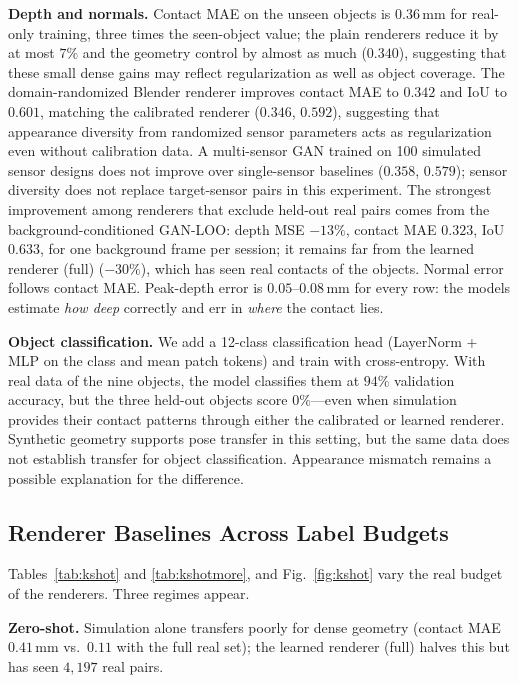 \noindent\textbf{Depth and normals.} Contact MAE on the unseen objects is $0.36\,$mm for real-only training, three times the seen-object value; the plain renderers reduce it by at most $7\%$ and the geometry control by almost as much ($0.340$), suggesting that these small dense gains may reflect regularization as well as object coverage. The domain-randomized Blender renderer improves contact MAE to $0.342$ and IoU to $0.601$, matching the calibrated renderer ($0.346$, $0.592$), suggesting that appearance diversity from randomized sensor parameters acts as regularization even without calibration data. A multi-sensor GAN trained on 100 simulated sensor designs does not improve over single-sensor baselines ($0.358$, $0.579$); sensor diversity does not replace target-sensor pairs in this experiment. The strongest improvement among renderers that exclude held-out real pairs comes from the background-conditioned GAN-LOO: depth MSE $-13\%$, contact MAE $0.323$, IoU $0.633$, for one background frame per session; it remains far from the learned renderer (full) ($-30\%$), which has seen real contacts of the objects. Normal error follows contact MAE. Peak-depth error is $0.05$--$0.08\,$mm for every row: the models estimate \emph{how deep} correctly and err in \emph{where} the contact lies.

\noindent\textbf{Object classification.} We add a 12-class classification head (LayerNorm + MLP on the class and mean patch tokens) and train with cross-entropy. With real data of the nine objects, the model classifies them at $94\%$ validation accuracy, but the three held-out objects score $0\%$---even when simulation provides their contact patterns through either the calibrated or learned renderer. Synthetic geometry supports pose transfer in this setting, but the same data does not establish transfer for object classification. Appearance mismatch remains a possible explanation for the difference.

\subsection{Renderer Baselines Across Label Budgets}
\label{sec:budget}
Tables~\ref{tab:kshot} and \ref{tab:kshotmore}, and Fig.~\ref{fig:kshot} vary the real budget of the renderers. Three regimes appear.

\noindent\textbf{Zero-shot.} Simulation alone transfers poorly for dense geometry (contact MAE $0.41\,$mm vs.\ $0.11$ with the full real set); the learned renderer (full) halves this but has seen $4{,}197$ real pairs.

